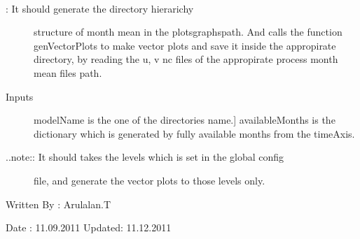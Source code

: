 \documentclass[letterpaper,10pt,english]{sphinxmanual}
\begin{document}
\begin{fulllineitems}
\label{diagnosis:generate_winds_plots.genMonthMeanDirs}~\begin{description}
\item[{{\hyperref[diagnosis:generate_winds_plots.genMonthMeanDirs]{}}: It should generate the directory hierarichy}] \leavevmode
structure of month mean in the plotsgraphspath. And calls the
function genVectorPlots to make vector plots and save it inside the
appropirate directory, by reading the u, v nc files of the appropirate
process month mean files path.

\item[{Inputs}] \leavevmode{[}modelName is the one of the directories name.{]}
availableMonths is the dictionary which is generated by fully
available months from the timeAxis.

\item[{..note:: It should takes the levels which is set in the global config}] \leavevmode
file, and generate the vector plots to those levels only.

\end{description}

Written By : Arulalan.T

Date : 11.09.2011
Updated: 11.12.2011

\end{fulllineitems}

\end{document}
